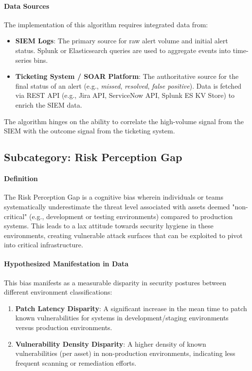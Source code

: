 \documentclass[11pt, a4paper]{article}
\begin{document}
\paragraph{Data Sources} The implementation of this algorithm requires integrated data from:
\begin{itemize}
    \item \textbf{SIEM Logs}: The primary source for raw alert volume and initial alert status. Splunk or Elasticsearch queries are used to aggregate events into time-series bins.
    \item \textbf{Ticketing System / SOAR Platform}: The authoritative source for the final status of an alert (e.g., \textit{missed}, \textit{resolved}, \textit{false positive}). Data is fetched via REST API (e.g., Jira API, ServiceNow API, Splunk ES KV Store) to enrich the SIEM data.
\end{itemize}
The algorithm hinges on the ability to correlate the high-volume signal from the SIEM with the outcome signal from the ticketing system.

\subsection{Subcategory: Risk Perception Gap}
\label{subsec:risk_perception_gap}

\paragraph{Definition} The Risk Perception Gap is a cognitive bias wherein individuals or teams systematically underestimate the threat level associated with assets deemed "non-critical" (e.g., development or testing environments) compared to production systems. This leads to a lax attitude towards security hygiene in these environments, creating vulnerable attack surfaces that can be exploited to pivot into critical infrastructure.

\paragraph{Hypothesized Manifestation in Data} This bias manifests as a measurable disparity in security postures between different environment classifications:
\begin{enumerate}
    \item \textbf{Patch Latency Disparity}: A significant increase in the mean time to patch known vulnerabilities for systems in development/staging environments versus production environments.
    \item \textbf{Vulnerability Density Disparity}: A higher density of known vulnerabilities (per asset) in non-production environments, indicating less frequent scanning or remediation efforts.
\end{enumerate}
\end{document}
